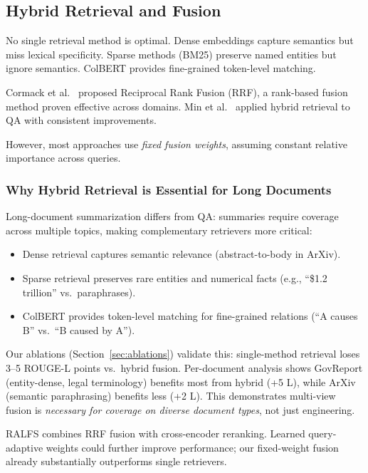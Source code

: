 \documentclass[11pt,a4paper]{article}
\begin{document}
\subsection{Hybrid Retrieval and Fusion}

No single retrieval method is optimal. Dense embeddings capture semantics but miss lexical specificity. Sparse methods (BM25) preserve named entities but ignore semantics. ColBERT \cite{khattab2020colbert} provides fine-grained token-level matching.

Cormack et al.\ \cite{cormack2009reciprocal} proposed Reciprocal Rank Fusion (RRF), a rank-based fusion method proven effective across domains. Min et al.\ \cite{min2021open} applied hybrid retrieval to QA with consistent improvements.

However, most approaches use \emph{fixed fusion weights}, assuming constant relative importance across queries.

\subsubsection{Why Hybrid Retrieval is Essential for Long Documents}

Long-document summarization differs from QA: summaries require coverage across multiple topics, making complementary retrievers more critical:

\begin{itemize}
\item Dense retrieval captures semantic relevance (abstract-to-body in ArXiv).
\item Sparse retrieval preserves rare entities and numerical facts (e.g., ``\$1.2 trillion'' vs.\ paraphrases).
\item ColBERT provides token-level matching for fine-grained relations (``A causes B'' vs.\ ``B caused by A'').
\end{itemize}

Our ablations (Section~\ref{sec:ablations}) validate this: single-method retrieval loses 3--5 ROUGE-L points vs.\ hybrid fusion. Per-document analysis shows GovReport (entity-dense, legal terminology) benefits most from hybrid (+5 L), while ArXiv (semantic paraphrasing) benefits less (+2 L). This demonstrates multi-view fusion is \emph{necessary for coverage on diverse document types}, not just engineering.

RALFS combines RRF fusion with cross-encoder reranking. Learned query-adaptive weights could further improve performance; our fixed-weight fusion already substantially outperforms single retrievers.
\end{document}
